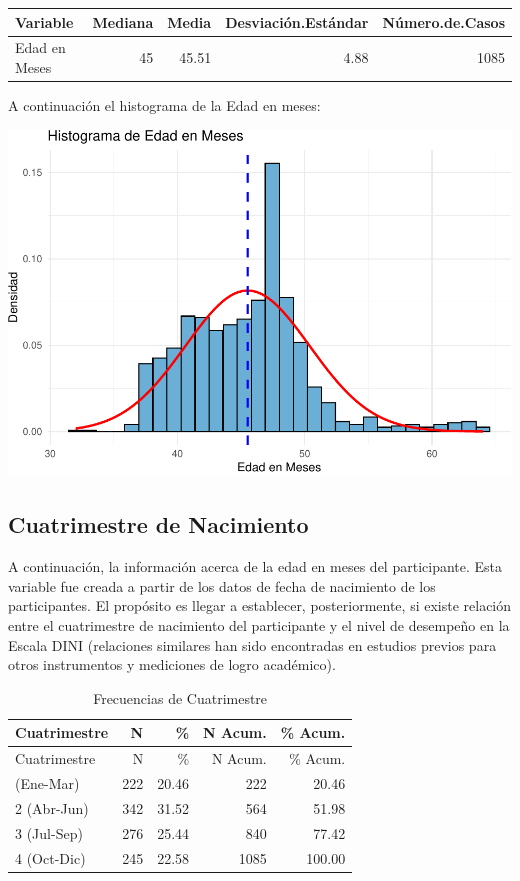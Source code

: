 \documentclass[
]{article}
\begin{document}
\begin{longtable}[]{@{}lrrrr@{}}
\toprule\noalign{}
Variable & Mediana & Media & Desviación.Estándar & Número.de.Casos \\
\midrule\noalign{}
\endhead
\bottomrule\noalign{}
\endlastfoot
Edad en Meses & 45 & 45.51 & 4.88 & 1085 \\
\end{longtable}

A continuación el histograma de la Edad en meses:

\includegraphics{Info_Dinix_02_files/figure-latex/30_AgeMo_Hist-1.pdf}

\subsection{Cuatrimestre de
Nacimiento}\label{cuatrimestre-de-nacimiento}

A continuación, la información acerca de la edad en meses del
participante. Esta variable fue creada a partir de los datos de fecha de
nacimiento de los participantes. El propósito es llegar a establecer,
posteriormente, si existe relación entre el cuatrimestre de nacimiento
del participante y el nivel de desempeño en la Escala DINI (relaciones
similares han sido encontradas en estudios previos para otros
instrumentos y mediciones de logro académico).

\begin{longtable}[]{@{}lrrrr@{}}
\caption{Frecuencias de Cuatrimestre}\tabularnewline
\toprule\noalign{}
Cuatrimestre & N & \% & N Acum. & \% Acum. \\
\midrule\noalign{}
\endfirsthead
\toprule\noalign{}
Cuatrimestre & N & \% & N Acum. & \% Acum. \\
\midrule\noalign{}
\endhead
\bottomrule\noalign{}
\endlastfoot
1 (Ene-Mar) & 222 & 20.46 & 222 & 20.46 \\
2 (Abr-Jun) & 342 & 31.52 & 564 & 51.98 \\
3 (Jul-Sep) & 276 & 25.44 & 840 & 77.42 \\
4 (Oct-Dic) & 245 & 22.58 & 1085 & 100.00 \\
\end{longtable}
\end{document}
